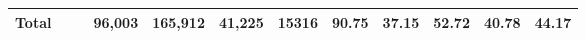 \begin{landscape}
\begin{table}
\begin{tabular}{lllccccccccc}
\textbf{Total}              & \textbf{}                                                     & \textbf{}                                                                & \textbf{96,003} & \textbf{165,912} & \textbf{41,225}                                                  & \textbf{15316} & \textbf{90.75} & \textbf{37.15} & \textbf{52.72} & \textbf{40.78}                                                    & \textbf{44.17}                                                     \\ \hline
\end{tabular}%
\end{table}
\end{landscape}

